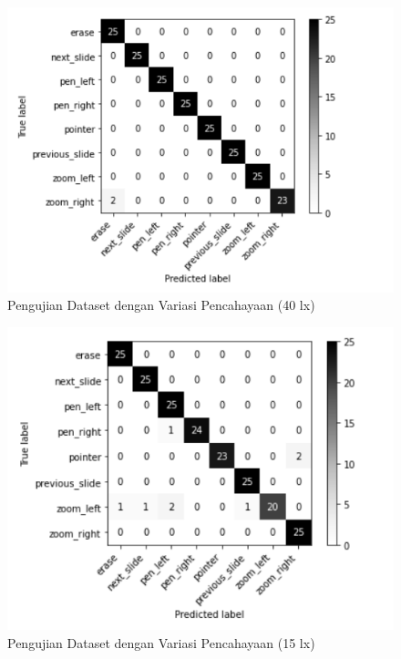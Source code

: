 \begin{figure}[!htb]
  \centering
  \includegraphics[scale=0.7]{gambar/pengujian-cahaya/40lux.png}
  \caption{Pengujian Dataset dengan Variasi Pencahayaan (40 lx)}
  \label{fig:Pengujian Dataset dengan Variasi Pencahayaan 40lux} 
\end{figure}

\begin{figure}[!htb]
  \centering
  \includegraphics[scale=0.75]{gambar/pengujian-cahaya/15lux.png}
  \caption{Pengujian Dataset dengan Variasi Pencahayaan (15 lx)}
  \label{fig:Pengujian Dataset dengan Variasi Pencahayaan 15lux} 
\end{figure}

